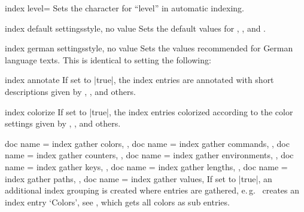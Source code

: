 \begin{docTcbKey}{index level}{=}{\tcbdocdescInit{!}}
  Sets the character for \enquote{level} in automatic indexing.
\end{docTcbKey}

\begin{docTcbKey}{index default settings}{}{style, no value}
  Sets the  default values for
  ,
  , and
  .
\end{docTcbKey}


\begin{docTcbKey}{index german settings}{}{style, no value}
  Sets the  values recommended for German language texts.
  This is identical to setting the following:
\begin{dispListing}
\end{dispListing}
\end{docTcbKey}


\begin{docTcbKey}{index annotate}{}{}
  If set to |true|, the index entries are annotated with short descriptions
  given by , ,
  and others.
\end{docTcbKey}

\begin{docTcbKey}{index colorize}{}{}
  If set to |true|, the index entries colorized according to the color
  settings given by , ,
  and others.
\end{docTcbKey}


\begin{docTcbKeys}[
    doc new          = {2022-06-20},
    doc key choices* = {defaultinit=true,false}
  ]
  {
    {
      doc name        = index gather colors,
    },
    {
      doc name        = index gather commands,
    },
    {
      doc name        = index gather counters,
    },
    {
      doc name        = index gather environments,
    },
    {
      doc name        = index gather keys,
    },
    {
      doc name        = index gather lengths,
    },
    {
      doc name        = index gather paths,
    },
    {
      doc name        = index gather values,
    }
  }
  If set to |true|, an additional index grouping is created where entries
  are gathered, e.\,g.\  creates an index
  entry `Colors', see , which gets all colors
  as sub entries.
\end{docTcbKeys}



